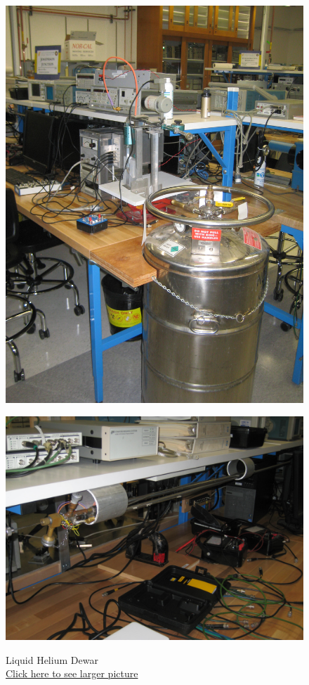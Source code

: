 \documentclass{../lab}
\begin{document}
\begin{figure}[!htb]
  \href{http://experimentationlab.berkeley.edu/sites/default/files/images/JOS-Dewar_3508.jpg}{\includegraphics[width=\linewidth,keepaspectratio]{images/JOS-Dewar_3508.jpg}}
  \caption{Liquid Helium Dewar \\
  \href{http://experimentationlab.berkeley.edu/sites/default/files/images/JOS-Dewar_3508.jpg}{Click here to see larger picture}}
  \label{fig:JOS-Dewar_3508.jpg}
\endminipage\hfill
{}
  \href{http://experimentationlab.berkeley.edu/sites/default/files/images/JOS-Probes_3506.jpg}{\includegraphics[width=\linewidth,keepaspectratio]{images/JOS-Probes_3506.jpg}}

\end{figure}
\end{document}
